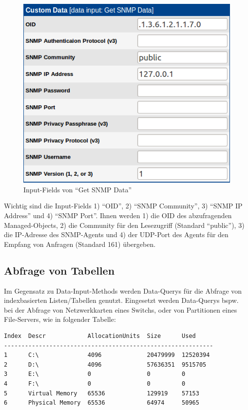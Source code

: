 \documentclass[12pt,ngerman,toc=listofnumbered,toc=bibliographynumbered,toc=index,headsepline=true]{scrbook}
\begin{document}
\begin{figure}[ht]
	\centering
	\includegraphics[scale=0.5]{bilder/getsnmpdata}
	\caption{Input-Fields von \enquote{Get SNMP Data}}
	\label{fig:getsnmpdata}
\end{figure}

Wichtig sind die Input-Fields 1) \enquote{OID}, 2) \enquote{SNMP Community}, 3)
\enquote{SNMP IP Address} und 4) \enquote{SNMP Port}. Ihnen werden 1) die OID
des abzufragenden Managed-Objects, 2) die Community für den Lesezugriff
(Standard \enquote{public}), 3) die IP-Adresse des SNMP-Agents und 4) der
UDP-Port des Agents für den Empfang von Anfragen (Standard 161) übergeben.

\subsection{Abfrage von Tabellen}
\label{subsubsec:SNMPTabelle}
Im Gegensatz zu Data-Input-Methods werden Data-Querys für die Abfrage von
indexbasierten Listen/Tabellen genutzt. Eingesetzt werden Data-Querys bspw. bei
der Abfrage von Netzwerkkarten eines Switchs, oder von Partitionen eines
File-Servers, wie in folgender Tabelle:

\begin{lstlisting}[xleftmargin=20pt]
Index  Descr            AllocationUnits  Size      Used
------------------------------------------------------------
1      C:\              4096             20479999  12520394
2      D:\              4096             57636351  9515705
3      E:\              0                0         0
4      F:\              0                0         0
5      Virtual Memory   65536            129919    57153
6      Physical Memory  65536            64974     50965
\end{lstlisting}
\end{document}
